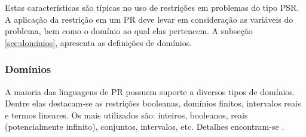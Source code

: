 \documentclass[12pt]{article}
\theoremstyle{definition}
\begin{document}
Estas  características são típicas no uso de restrições em problemas do tipo PSR. A aplicação da restrição em um PR deve levar em consideração as variáveis do problema, bem como o domínio ao qual elas pertencem. A subseção 
\ref{sec:dominios}, apresenta as definições de domínios.

\subsubsection*{Domínios}
\label{sec:dominios}

A maioria das linguagens de PR possuem suporte a diversos tipos de domínios. Dentre elas destacam-se as restrições booleanas, domínios finitos, intervalos reais e termos lineares. 
 Os mais utilizados são: inteiros, booleanos, reais (potencialmente infinito), conjuntos, intervalos, etc. Detalhes encontram-se \cite{apt_2003}.
\end{document}
